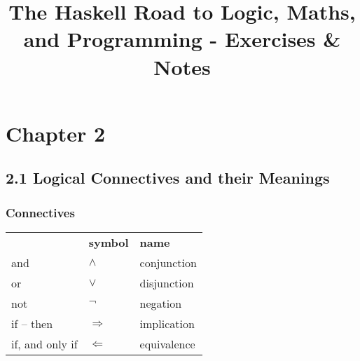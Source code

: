 \documentclass[11pt]{article}
\title{\textbf{The Haskell Road to Logic, Maths, and Programming - Exercises \& Notes}}
\author{}
\date{}
\begin{document}
\maketitle
\thispagestyle{empty}

\section*{Chapter 2}
\subsection*{2.1 Logical Connectives and their Meanings}
\subsubsection*{Connectives}

\begin{tabular}{lll}
     {} & \textbf{symbol} & \textbf{name}\\
	and & $\land$ & conjunction\\
	or & $\lor$ & disjunction\\
	not & $\neg$ & negation\\
	if -- then & $\Rightarrow$ & implication\\
	if, and only if & $\Leftarrow$ & equivalence\\
\end{tabular}
\end{document}
